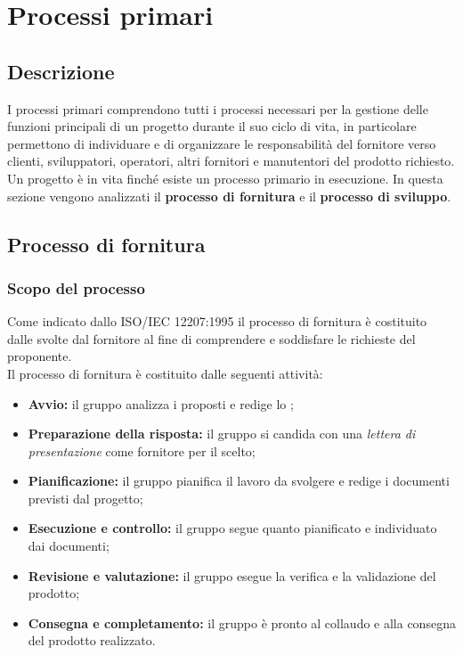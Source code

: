 \section{Processi primari}
\label{PP}
\subsection{Descrizione}\label{PP_Descrizione}
I processi primari comprendono tutti i processi necessari per la gestione delle funzioni principali di un progetto durante il suo ciclo di vita, in particolare permettono di individuare e di organizzare le responsabilità del fornitore verso clienti, sviluppatori, operatori, altri fornitori e manutentori del prodotto richiesto.\\
Un progetto è in vita finché esiste un processo primario in esecuzione.
In questa sezione vengono analizzati il \textbf{processo di fornitura} e il \textbf{processo di sviluppo}.

\subsection{Processo di fornitura}
\subsubsection{Scopo del processo}\label{PF_Scopo}
Come indicato dallo  ISO/IEC 12207:1995 il processo di fornitura è costituito dalle  svolte dal fornitore al fine di comprendere e soddisfare le richieste del proponente.\\
Il processo di fornitura è costituito dalle seguenti attività:
\begin{itemize}
	\item \textbf{Avvio:} il gruppo analizza i  proposti e redige lo ;
	\item \textbf{Preparazione della risposta:} il gruppo si candida con una \textit{lettera di presentazione} come fornitore per il  scelto;
	\item \textbf{Pianificazione:} il gruppo pianifica il lavoro da svolgere e redige i documenti previsti dal progetto;
	\item \textbf{Esecuzione e controllo:} il gruppo segue quanto pianificato e individuato dai documenti;
	\item \textbf{Revisione e valutazione:} il gruppo esegue la verifica e la validazione del prodotto;
	\item \textbf{Consegna e completamento:} il gruppo è pronto al collaudo e alla consegna del prodotto realizzato.
\end{itemize}

